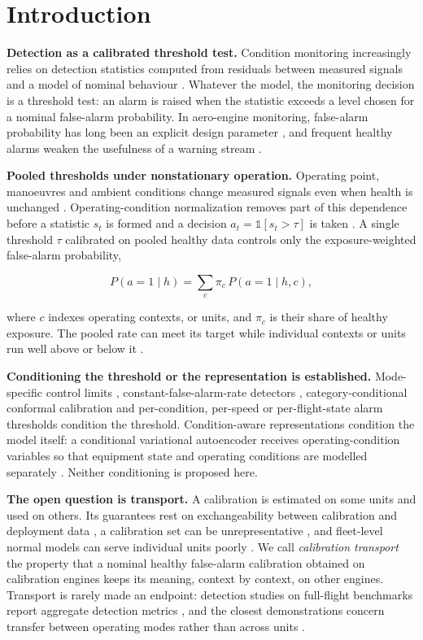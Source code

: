 \documentclass[preprint,11pt,a4paper]{elsarticle}
\begin{document}
\section{Introduction}

\textbf{Detection as a calibrated threshold test.} Condition monitoring increasingly relies on detection statistics computed from residuals between measured signals and a model of nominal behaviour \cite{N1}. Whatever the model, the monitoring decision is a threshold test: an alarm is raised when the statistic exceeds a level chosen for a nominal false-alarm probability. In aero-engine monitoring, false-alarm probability has long been an explicit design parameter \cite{ref2,ref11}, and frequent healthy alarms weaken the usefulness of a warning stream \cite{ref12}.

\textbf{Pooled thresholds under nonstationary operation.} Operating point, manoeuvres and ambient conditions change measured signals even when health is unchanged \cite{N2,N3,N4}. Operating-condition normalization removes part of this dependence before a statistic $s_t$ is formed and a decision $a_t = \mathbb{1}[s_t > \tau]$ is taken \cite{N2,N4,N5,N6}. A single threshold $\tau$ calibrated on pooled healthy data controls only the exposure-weighted false-alarm probability,

\[P(a=1\mid h) = \sum_{c} \pi_c \, P(a=1 \mid h,c),\]

where $c$ indexes operating contexts, or units, and $\pi_c$ is their share of healthy exposure. The pooled rate can meet its target while individual contexts or units run well above or below it \cite{N7}.

\textbf{Conditioning the threshold or the representation is established.} Mode-specific control limits \cite{N8}, constant-false-alarm-rate detectors \cite{N10}, category-conditional conformal calibration \cite{N7,N45} and per-condition, per-speed or per-flight-state alarm thresholds \cite{N22,N25,N26,N27} condition the threshold. Condition-aware representations condition the model itself: a conditional variational autoencoder receives operating-condition variables so that equipment state and operating conditions are modelled separately \cite{N38}. Neither conditioning is proposed here.

\textbf{The open question is transport.} A calibration is estimated on some units and used on others. Its guarantees rest on exchangeability between calibration and deployment data \cite{N20}, a calibration set can be unrepresentative \cite{N16}, and fleet-level normal models can serve individual units poorly \cite{N44}. We call \emph{calibration transport} the property that a nominal healthy false-alarm calibration obtained on calibration engines keeps its meaning, context by context, on other engines. Transport is rarely made an endpoint: detection studies on full-flight benchmarks report aggregate detection metrics \cite{ref7,ref8,ref9,N42}, and the closest demonstrations concern transfer between operating modes rather than across units \cite{N23}.
\end{document}
